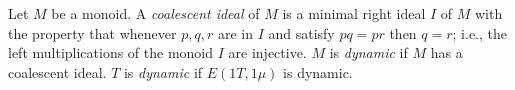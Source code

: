 Let $M$ be a monoid. A \textit{coalescent ideal} of $M$ is a minimal right ideal $I$ of $M$ with the property that whenever $p, q, r$ are in $I$ and satisfy $pq = pr$ then $q = r$; i.e., the left multiplications of the monoid $I$ are injective. $M$ is \textit{dynamic} if $M$ has a coalescent ideal. $T$ is \textit{dynamic} if $E(1T, 1\mu)$ is dynamic.
